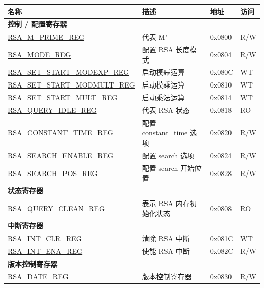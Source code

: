 \begin{longtable}{ | l | l | l | l | }
\hline\rowcolor{lightgray}
\textbf{名称} & \textbf{描述} &  \textbf{地址} & \textbf{访问} \\ \hline
\multicolumn{4}{|l|}{\textbf{控制 / 配置寄存器}} \\ \hline
\hyperref[regdesc:RSAMPRIMEREG]{RSA\_M\_PRIME\_REG} & 代表 M’ & 0x0800 & R/W \\ \hline
\hyperref[regdesc:RSAMODEREG]{RSA\_MODE\_REG} & 配置 RSA 长度模式 & 0x0804 & R/W \\ \hline
\hyperref[regdesc:RSASETSTARTMODEXPREG]{RSA\_SET\_START\_MODEXP\_REG} & 启动模幂运算 & 0x080C & WT \\ \hline
\hyperref[regdesc:RSASETSTARTMODMULTREG]{RSA\_SET\_START\_MODMULT\_REG} & 启动模乘运算 & 0x0810 & WT \\ \hline
\hyperref[regdesc:RSASETSTARTMULTREG]{RSA\_SET\_START\_MULT\_REG} & 启动乘法运算 & 0x0814 & WT \\ \hline
\hyperref[regdesc:RSAQUERYIDLEREG]{RSA\_QUERY\_IDLE\_REG} & 代表 RSA 状态 & 0x0818 & RO \\ \hline
\hyperref[regdesc:RSACONSTANTTIMEREG]{RSA\_CONSTANT\_TIME\_REG} & 配置 constant\_time 选项 & 0x0820 & R/W \\ \hline
\hyperref[regdesc:RSASEARCHENABLEREG]{RSA\_SEARCH\_ENABLE\_REG} & 配置 search 选项 & 0x0824 & R/W \\ \hline
\hyperref[regdesc:RSASEARCHPOSREG]{RSA\_SEARCH\_POS\_REG} & 配置 search 开始位置 & 0x0828 & R/W \\ \hline
\multicolumn{4}{|l|}{\textbf{状态寄存器}} \\ \hline
\hyperref[regdesc:RSAQUERYCLEANREG]{RSA\_QUERY\_CLEAN\_REG} & 表示 RSA 内存初始化状态  & 0x0808 & RO \\ \hline
\multicolumn{4}{|l|}{\textbf{中断寄存器}} \\ \hline
\hyperref[regdesc:RSAINTCLRREG]{RSA\_INT\_CLR\_REG} & 清除 RSA 中断 & 0x081C & WT \\ \hline
\hyperref[regdesc:RSAINTENAREG]{RSA\_INT\_ENA\_REG} & 使能 RSA 中断 & 0x082C & R/W \\ \hline
\multicolumn{4}{|l|}{\textbf{版本控制寄存器}} \\ \hline
\hyperref[regdesc:RSADATEREG]{RSA\_DATE\_REG} & 版本控制寄存器 & 0x0830 & R/W \\ \hline
\end{longtable}
